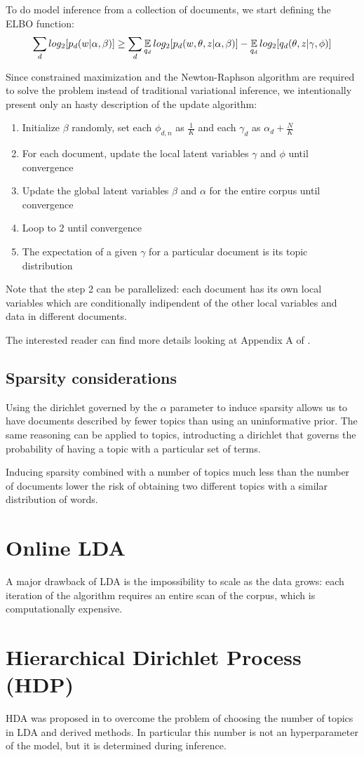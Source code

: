 To do model inference from a collection of documents, we start defining the ELBO function:
\begin{equation*}
    \sum_d log_2 [p_d(w | \alpha, \beta)] \geq \sum_d \operatorname*{\mathbb{E}}_{q_d} log_2[p_d(w, \theta, z | \alpha, \beta)] - \operatorname*{\mathbb{E}}_{q_d} log_2[q_d(\theta, z | \gamma, \phi)]
\end{equation*}

Since constrained maximization and
the Newton-Raphson algorithm are required to solve the problem
instead of traditional variational inference,
we intentionally present only an hasty description of the update algorithm:
\begin{enumerate}
    \item Initialize $\beta$ randomly, set each $\phi_{d,n}$ as $\frac{1}{K}$ and each $\gamma_d$ as $\alpha_d + \frac{N}{K}$
    \item For each document, update the local latent variables $\gamma$ and $\phi$ until convergence
    \item Update the global latent variables $\beta$ and $\alpha$ for the entire corpus until convergence
    \item Loop to 2 until convergence
    \item The expectation of a given $\gamma$ for a particular document is its topic distribution
\end{enumerate}
Note that the step 2 can be parallelized: each document has its own local variables which are conditionally indipendent
of the other local variables and data in different documents.

The interested reader can find more details looking at Appendix A of \cite{DBLP:journals/jmlr/BleiNJ03}.

\subsection{Sparsity considerations}
Using the dirichlet governed by the $\alpha$ parameter to induce sparsity
allows us to have documents described by fewer topics than using an uninformative prior.
The same reasoning can be applied to topics, introducting a dirichlet that governs the
probability of having a topic with a particular set of terms.

Inducing sparsity combined with a number of topics much less than the number of documents
lower the risk of obtaining two different topics with a similar distribution of words.


\section{Online LDA}
A major drawback of LDA is the impossibility to scale as the data grows:
each iteration of the algorithm requires an entire scan of the corpus, which is computationally expensive.

\section{Hierarchical Dirichlet Process (HDP)}
HDA was proposed in \cite{DBLP:journals/jmlr/WangPB11} to overcome the problem of choosing the number of topics in LDA and derived methods.
In particular this number is not an hyperparameter of the model, but it is determined during inference.

